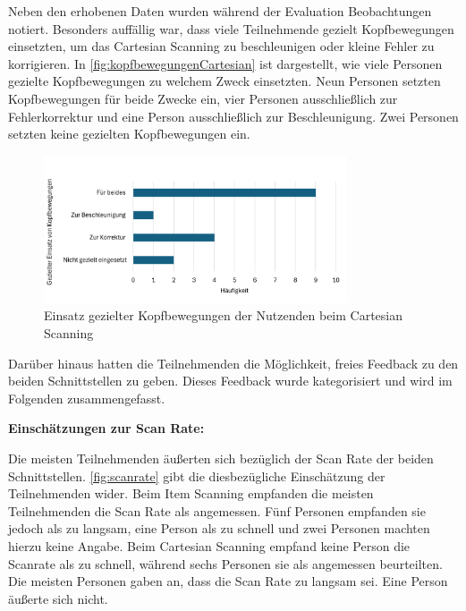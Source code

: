 Neben den erhobenen Daten wurden während der Evaluation Beobachtungen notiert. Besonders auffällig war, dass viele Teilnehmende gezielt Kopfbewegungen einsetzten, um das Cartesian Scanning zu beschleunigen oder kleine Fehler zu korrigieren. In \autoref{fig:kopfbewegungenCartesian} ist dargestellt, wie viele Personen gezielte Kopfbewegungen zu welchem Zweck einsetzten. Neun Personen setzten Kopfbewegungen für beide Zwecke ein, vier Personen ausschließlich zur Fehlerkorrektur und eine Person ausschließlich zur Beschleunigung. Zwei Personen setzten keine gezielten Kopfbewegungen ein.

\begin{figure}[tbh]
    \centering
    \includegraphics[width=0.8\textwidth]{images/Results/EinsatzKopfbewegungen-Cartesian.png}
    \caption{Einsatz gezielter Kopfbewegungen der Nutzenden beim Cartesian Scanning}
    \label{fig:kopfbewegungenCartesian}
\end{figure}

Darüber hinaus hatten die Teilnehmenden die Möglichkeit, freies Feedback zu den beiden Schnittstellen zu geben. Dieses Feedback wurde kategorisiert und wird im Folgenden zusammengefasst. 

\textbf{Einschätzungen zur Scan Rate:}

Die meisten Teilnehmenden äußerten sich bezüglich der Scan Rate der beiden Schnittstellen. \autoref{fig:scanrate} gibt die diesbezügliche Einschätzung der Teilnehmenden wider. Beim Item Scanning empfanden die meisten Teilnehmenden die Scan Rate als angemessen. Fünf Personen empfanden sie jedoch als zu langsam, eine Person als zu schnell und zwei Personen machten hierzu keine Angabe. Beim Cartesian Scanning empfand keine Person die Scanrate als zu schnell, während sechs Personen sie als angemessen beurteilten. Die meisten Personen gaben an, dass die Scan Rate zu langsam sei. Eine Person äußerte sich nicht.

